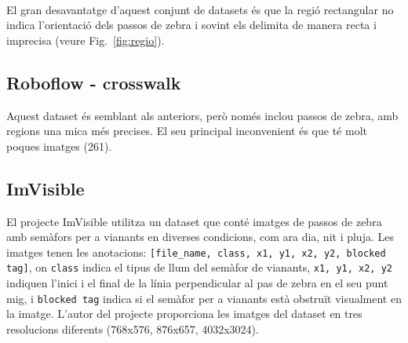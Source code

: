 \documentclass[10pt,a4paper,twocolumn,twoside]{article}
\begin{document}
\\
El gran desavantatge d'aquest conjunt de datasets és que la regió rectangular no indica l'orientació dels passos de zebra i sovint els delimita de manera recta i imprecisa (veure Fig.~\ref{fig:regio}).


\subsection*{Roboflow - crosswalk \cite{RoboflowMultiView}}
Aquest dataset és semblant als anteriors, però només inclou passos de zebra, amb regions una mica més precises. El seu principal inconvenient és que té molt poques imatges (261).


\subsection*{ImVisible \cite{ImVisible}}
El projecte ImVisible utilitza un dataset que conté imatges de passos de zebra amb semàfors per a vianants en diverses condicions, com ara dia, nit i pluja. Les imatges tenen les anotacions: \texttt{[file\_name, class, x1, y1, x2, y2, blocked tag]}, on \texttt{class} indica el tipus de llum del semàfor de vianants, \texttt{x1, y1, x2, y2} indiquen l’inici i el final de la línia perpendicular al pas de zebra en el seu punt mig, i \texttt{blocked tag} indica si el semàfor per a vianants està obstruït visualment en la imatge. L'autor del projecte proporciona les imatges del dataset en tres resolucions diferents (768x576, 876x657, 4032x3024).
\end{document}
